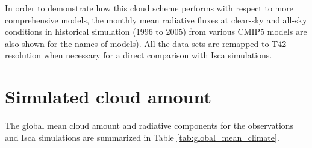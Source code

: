 In order to demonstrate how this cloud scheme performs with respect to more comprehensive models, the monthly mean radiative fluxes at clear-sky and all-sky conditions in historical simulation (1996 to 2005) from various CMIP5 models are also shown for the names of models). All the data sets are remapped to T42 resolution when necessary for a direct comparison with Isca simulations.

\section{Simulated cloud amount}
\label{sec:cld_amt}

The global mean cloud amount and radiative components for the observations and Isca simulations are summarized in Table \ref{tab:global_mean_climate}. 

